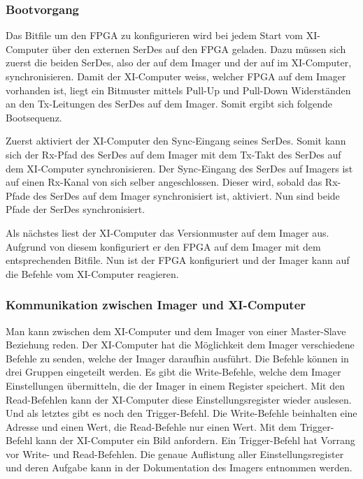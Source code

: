 \documentclass{article}
\begin{document}
\subsubsection*{Bootvorgang}
\label{sec:varian_boot_sequence}
Das Bitfile um den FPGA zu konfigurieren wird bei jedem Start vom XI-Computer über den externen SerDes auf den FPGA geladen. Dazu müssen sich zuerst die beiden SerDes, also der auf dem Imager und der auf im XI-Computer, synchronisieren. Damit der XI-Computer weiss, welcher FPGA auf dem Imager vorhanden ist, liegt ein Bitmuster mittels Pull-Up und Pull-Down Widerständen an den Tx-Leitungen des SerDes auf dem Imager. Somit ergibt sich folgende Bootsequenz.

Zuerst aktiviert der XI-Computer den Sync-Eingang seines SerDes. Somit kann sich der Rx-Pfad des SerDes auf dem Imager mit dem Tx-Takt des SerDes auf dem XI-Computer synchronisieren. Der Sync-Eingang des SerDes auf Imagers ist auf einen Rx-Kanal von sich selber angeschlossen. Dieser wird, sobald das Rx-Pfade des SerDes auf dem Imager synchronisiert ist, aktiviert. Nun sind beide Pfade der SerDes synchronisiert.

Als nächstes liest der XI-Computer das Versionmuster auf dem Imager aus. Aufgrund von diesem konfiguriert er den FPGA auf dem Imager mit dem entsprechenden Bitfile. Nun ist der FPGA konfiguriert und der Imager kann auf die Befehle vom XI-Computer reagieren. 

\subsubsection*{Kommunikation zwischen Imager und XI-Computer}
\label{sec:varian_com}

Man kann zwischen dem XI-Computer und dem Imager von einer Master-Slave Beziehung reden. Der XI-Computer hat die Möglichkeit dem Imager verschiedene Befehle zu senden, welche der Imager daraufhin ausführt. Die Befehle können in drei Gruppen eingeteilt werden. Es gibt die Write-Befehle, welche dem Imager Einstellungen übermitteln, die der Imager in einem Register speichert. Mit den Read-Befehlen kann der XI-Computer diese Einstellungsregister wieder auslesen. Und als letztes gibt es noch den Trigger-Befehl. Die Write-Befehle beinhalten eine Adresse und einen Wert, die Read-Befehle nur einen Wert. Mit dem Trigger-Befehl kann der XI-Computer ein Bild anfordern. Ein Trigger-Befehl hat Vorrang vor Write- und Read-Befehlen. Die genaue Auflistung aller Einstellungsregister und deren Aufgabe kann in der Dokumentation des Imagers entnommen werden. 
\end{document}
